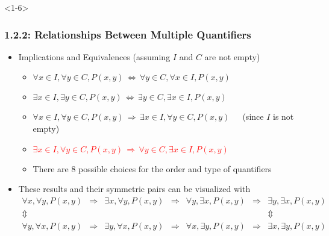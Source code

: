 \documentclass[10pt,english,aspectratio=169]{beamer}
\begin{document}
\begin{frame}<1-6> \frametitle{1.2.2: Relationships Between Multiple Quantifiers}

\begin{itemize}
\setlength\itemsep{5mm}
\item<1-> Implications and Equivalences (assuming $I$ and $C$ are not empty) \vspace{1mm}
\begin{itemize}
 \setlength\itemsep{1.5mm}
 \item<1-> $\forall x\!\in\! I, \forall y\!\in\! C, P(x,y)  \,\Leftrightarrow\, \forall y\!\in\! C, \forall x\!\in\! I, P(x,y)$
 \item<2-> $\exists x\!\in\! I, \exists y\!\in\! C, P(x,y) \,\Leftrightarrow\, \exists y\!\in\! C, \exists x\!\in\! I, P(x,y)$
 \item<3-> $\forall x\!\in\! I, \forall y\!\in\! C, P(x,y) \,\Rightarrow\, \exists x\!\in\! I, \forall y\!\in\! C, P(x,y)$~~~(since $I$ is not empty)
 \item<4-> \textcolor{red}{$\exists x\!\in\! I, \forall y\!\in\! C, P(x,y) \,\Rightarrow\, \forall y\!\in\! C, \exists x\!\in\! I, P(x,y)$}
 \item<5-> There are 8 possible choices for the order and type of quantifiers
    
\end{itemize}

 \item<6-> These results and their symmetric pairs can be visualized with \\[-3mm] {\small \color{blue} \[ \begin{array}{ccccccc}
   \forall x, \forall y, P(x,y) & \Rightarrow & \exists x, \forall y, P(x,y) & \Rightarrow & \forall y, \exists x, P(x,y) & \Rightarrow & \exists y, \exists x, P(x,y) \\
   \Updownarrow &&&&&& \Updownarrow \\
   \forall y, \forall x, P(x,y) & \Rightarrow & \exists y, \forall x, P(x,y) & \Rightarrow & \forall x, \exists y, P(x,y) & \Rightarrow & \exists x, \exists y, P(x,y)
   \end{array} \]}

\end{itemize}



\end{frame}
\end{document}

